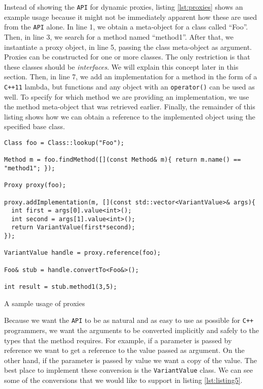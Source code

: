 Instead of showing the \texttt{API} for dynamic proxies, listing \ref{lst:proxies} shows an example
usage because it might not be immediately apparent how these are used from the \texttt{API} alone.
In line 1, we obtain a meta-object for a class called ``Foo''. Then, in line 3, we search for a
method named ``method1''. After that, we instantiate a proxy object, in line 5, passing the class
meta-object as argument. Proxies can be constructed for one or more classes. The only restriction is
that these classes should be \emph{interfaces}. We will explain this concept later in this section.
Then, in line 7, we add an implementation for a method in the form of a \texttt{C++11} lambda, but functions
and any object with an \texttt{operator()} can be used as well. To specify for which method we are
providing an implementation, we use the method meta-object that was retrieved earlier.
Finally, the remainder of this listing shows how we can obtain a reference to the implemented object
using the specified base class.

\begin{listing}
\begin{verbatim}
Class foo = Class::lookup("Foo");

Method m = foo.findMethod([](const Method& m){ return m.name() == "method1"; });

Proxy proxy(foo);

proxy.addImplementation(m, [](const std::vector<VariantValue>& args){
  int first = args[0].value<int>();
  int second = args[1].value<int>();
  return VariantValue(first*second);
});

VariantValue handle = proxy.reference(foo);

Foo& stub = handle.convertTo<Foo&>();

int result = stub.method1(3,5);
\end{verbatim}
\caption{A sample usage of proxies}
\label{lst:proxies}
\end{listing}

Because we want the \texttt{API} to be as natural and as easy to use as possible for \texttt{C++} programmers,
we want the arguments to be converted implicitly and safely to the types that the method requires.
For example, if a parameter is passed by reference we want to get a reference to the value passed as argument.
On the other hand, if the parameter is passed by value we want a copy of the value. The best place to implement
these conversion is the \texttt{VariantValue} class. We can see some of the conversions that we would like to
support in listing \ref{lst:listing5}.

